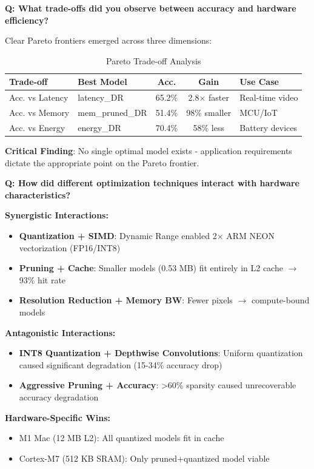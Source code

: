 \documentclass[10pt, a4paper]{article}
\begin{document}
\textbf{Q: What trade-offs did you observe between accuracy and hardware efficiency?}

Clear Pareto frontiers emerged across three dimensions:

\begin{table}[H]
\centering
\footnotesize
\begin{tabular}{|l|l|c|c|p{3cm}|}
\hline
\textbf{Trade-off} & \textbf{Best Model} & \textbf{Acc.} & \textbf{Gain} & \textbf{Use Case} \\
\hline
Acc. vs Latency & latency\_DR & 65.2\% & 2.8× faster & Real-time video \\
Acc. vs Memory & mem\_pruned\_DR & 51.4\% & 98\% smaller & MCU/IoT \\
Acc. vs Energy & energy\_DR & 70.4\% & 58\% less & Battery devices \\
\hline
\end{tabular}
\caption{Pareto Trade-off Analysis}
\end{table}

\textbf{Critical Finding}: No single optimal model exists - application requirements dictate the appropriate point on the Pareto frontier.

\textbf{Q: How did different optimization techniques interact with hardware characteristics?}

\textbf{Synergistic Interactions:}
\begin{itemize}
    \item \textbf{Quantization + SIMD}: Dynamic Range enabled 2× ARM NEON vectorization (FP16/INT8)
    \item \textbf{Pruning + Cache}: Smaller models (0.53 MB) fit entirely in L2 cache $\rightarrow$ 93\% hit rate
    \item \textbf{Resolution Reduction + Memory BW}: Fewer pixels $\rightarrow$ compute-bound models
\end{itemize}

\textbf{Antagonistic Interactions:}
\begin{itemize}
    \item \textbf{INT8 Quantization + Depthwise Convolutions}: Uniform quantization caused significant degradation (15-34\% accuracy drop)
    \item \textbf{Aggressive Pruning + Accuracy}: >60\% sparsity caused unrecoverable accuracy degradation
\end{itemize}

\textbf{Hardware-Specific Wins:}
\begin{itemize}
    \item M1 Mac (12 MB L2): All quantized models fit in cache
    \item Cortex-M7 (512 KB SRAM): Only pruned+quantized model viable
\end{itemize}
\end{document}
